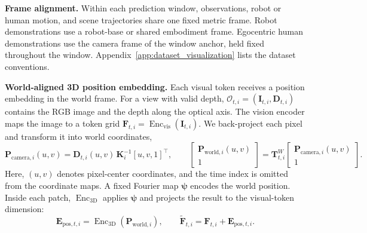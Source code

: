 \noindent\textbf{Frame alignment.}
Within each prediction window, observations, robot or human motion, and
scene trajectories share one fixed metric frame.
Robot demonstrations use a robot-base or shared embodiment frame.
Egocentric human demonstrations use the camera frame of the window anchor,
held fixed throughout the window.
Appendix~\ref{app:dataset_visualization} lists the dataset conventions.

\noindent\textbf{World-aligned 3D position embedding.}
Each visual token receives a position embedding in the world frame.
For a view with valid depth,
$\mathcal O_{t,i}=(\mathbf I_{t,i},\mathbf D_{t,i})$ contains the RGB
image and the depth along the optical axis.
The vision encoder maps the image to a token grid
$\mathbf F_{t,i}=\operatorname{Enc}_{\mathrm{vis}}(\mathbf I_{t,i})$.
We back-project each pixel and transform it into world coordinates,
\begin{equation}
    \mathbf P_{\mathrm{camera},i}(u,v)
    =\mathbf D_{t,i}(u,v)\,\mathbf K_i^{-1}[u,v,1]^\top,
    \qquad
    \begin{bmatrix}
        \mathbf P_{\mathrm{world},i}(u,v)\\ 1
    \end{bmatrix}
    =\mathbf T^W_{t,i}
    \begin{bmatrix}
        \mathbf P_{\mathrm{camera},i}(u,v)\\ 1
    \end{bmatrix}.
    \label{eq:world_coordinate_map}
\end{equation}
Here, $(u,v)$ denotes pixel-center coordinates, and the time index is
omitted from the coordinate maps.
A fixed Fourier map $\boldsymbol\psi$ encodes the world position.
Inside each patch, $\operatorname{Enc}_{\mathrm{3D}}$ applies
$\boldsymbol\psi$ and projects the result to the visual-token dimension:
\begin{equation}
    \mathbf E_{\mathrm{pos},t,i}
    =\operatorname{Enc}_{\mathrm{3D}}(\mathbf P_{\mathrm{world},i}),
    \qquad
    \widetilde{\mathbf F}_{t,i}
    =\mathbf F_{t,i}+\mathbf E_{\mathrm{pos},t,i}.
    \label{eq:depth_position_embedding}
\end{equation}

